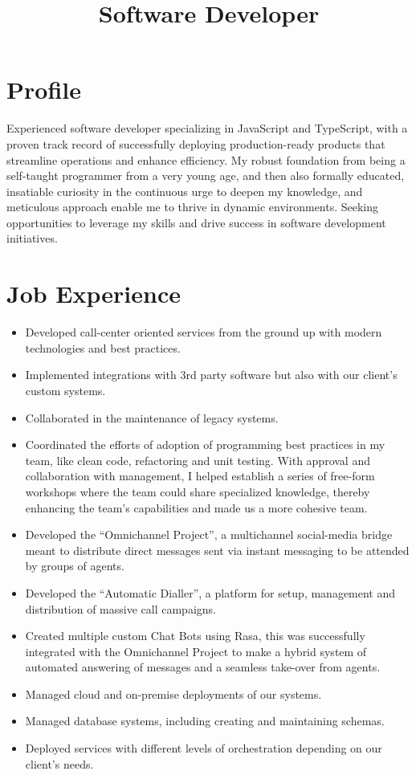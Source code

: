 \documentclass[11pt,letterpaper,sans]{moderncv}
\title{Software Developer}
\begin{document}
\makecvtitle

\section{Profile}
Experienced software developer specializing in JavaScript and TypeScript, with a proven track record of successfully deploying production-ready products that streamline operations and enhance efficiency.
My robust foundation from being a self-taught programmer from a very young age, and then also formally educated, insatiable curiosity in the continuous urge to deepen my knowledge, and meticulous approach enable me to thrive in dynamic environments.
Seeking opportunities to leverage my skills and drive success in software development initiatives.

\section{Job Experience}
\begin{itemize}
  \item Developed call-center oriented services from the ground up with modern technologies and best practices.
  \item Implemented integrations with 3rd party software but also with our client's custom systems.
  \item Collaborated in the maintenance of legacy systems.
  \item Coordinated the efforts of adoption of programming best practices in my team, like clean code, refactoring and unit testing. With approval and collaboration with management, I helped establish a series of free-form workshops where the team could share specialized knowledge, thereby enhancing the team's capabilities and made us a more cohesive team.
  \item Developed the ``Omnichannel Project'', a multichannel social-media bridge meant to distribute direct messages sent via instant messaging to be attended by groups of agents.
  \item Developed the ``Automatic Dialler'', a platform for setup, management and distribution of massive call campaigns.
  \item Created multiple custom Chat Bots using Rasa, this was successfully integrated with the Omnichannel Project to make a hybrid system of automated answering of messages and a seamless take-over from agents.
  \item Managed cloud and on-premise deployments of our systems.
  \item Managed database systems, including creating and maintaining schemas.
  \item Deployed services with different levels of orchestration depending on our client's needs.
\end{itemize}
\end{document}
